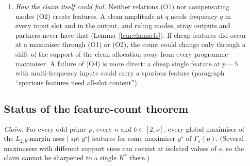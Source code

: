 \documentclass[11pt]{article}
\theoremstyle{definition}
\begin{document}
\begin{enumerate}
architecture, (O3) and (O4) ask for (S$_p$) with room, certified at some finite degree.  A degree-$d$ product factorises only under
order-$(d+1)$ dissociation, whose capacity
is smaller: at most $\log_{d+2}p$ elements (the sums $\sum_l\varepsilon_ll$ with $0\le\varepsilon_l\le d+1$ must be distinct), against $\log_3p$ for $d=1$.  So the two kinds of open problem pull in opposite directions.  (O3) and (O4) improve with the degree of the
per-feature test; (O1) gets harder with it.  For $n=2,3$ at $b=2$ the quadratic level is enough on the (O3) side.
\item \emph{How the claim itself could fail.}  Neither relations (O1) nor compensating modes (O2) create features.  A clean amplitude at $q$ needs
frequency $q$ in every input slot and in the output, and riding modes, stray outputs and partners never have that (Lemma~\ref{lem:channels}).  If
cheap features did occur at a maximiser through (O1) or (O2), the count could change only through a shift of the support of the clean
allocation away from every programme maximiser.  A failure of (O4) is more direct: a cheap single feature at $p=5$ with
multi-frequency inputs could carry a spurious feature (paragraph ``spurious features need all-slot content'').
\end{enumerate}

\subsection*{Status of the feature-count theorem}
\emph{Claim.}  For every odd prime $p$, every $n$ and $b\in[2,\nu]$, every global maximiser of the $L_{2,b}$-margin uses
$|\operatorname{spt}y^\star|$ features for some maximiser $y^\star$ of $\Gamma_s(p)$.  (Several maximisers with different support sizes
can coexist at isolated values of $s$, so the claim cannot be sharpened to a single $K^*$ there.)
\end{document}
